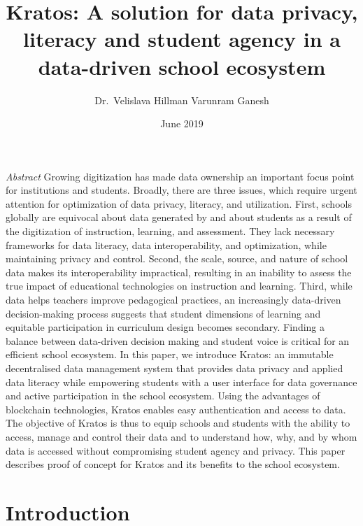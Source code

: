 \documentclass{article}
\title{Kratos: A solution for data privacy, literacy and student agency in a data-driven school ecosystem}
\author{Dr.\ Velislava Hillman \quad Varunram Ganesh}
\date{June 2019}
\begin{document}
\maketitle

\textit{Abstract}
Growing digitization has made data ownership an important focus point for institutions and students. Broadly, there are three issues, which require urgent attention for optimization of data privacy, literacy, and utilization. First, schools globally are equivocal about data generated by and about students as a result of the digitization of instruction, learning, and assessment. They lack necessary frameworks for data literacy, data interoperability, and optimization, while maintaining privacy and control. Second, the scale, source, and nature of school data makes its interoperability impractical, resulting in an inability to assess the true impact of educational technologies on instruction and learning. Third, while data helps teachers improve pedagogical practices, an increasingly data-driven decision-making process suggests that student dimensions of learning and equitable participation in curriculum design becomes secondary. Finding a balance between data-driven decision making and student voice is critical for an efficient school ecosystem. In this paper, we introduce Kratos: an immutable decentralised data management system that provides data privacy and applied data literacy while empowering students with a user interface for data governance and active participation in the school ecosystem. Using the advantages of blockchain technologies, Kratos enables easy authentication and access to data. The objective of Kratos is thus to equip schools and students with the ability to access, manage and control their data and to understand how, why, and by whom data is accessed without compromising student agency and privacy. This paper describes proof of concept for Kratos and its benefits to the school ecosystem.
\bigbreak
\newpage
\section{Introduction}
\end{document}
